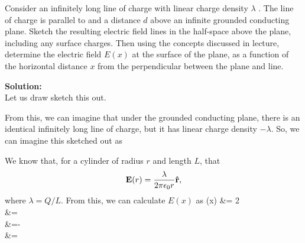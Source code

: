\documentclass[11pt]{article}
\def\bal#1\eal{\begin{align*}#1\end{align*}}
\newcommand{\pn}[1]{\left( #1 \right)}
\begin{document}
\clearpage

\begin{problem}[4.]
Consider an infinitely long line of charge with linear charge density $\lambda$ . The line of charge
is parallel to and a distance $d$ above an infinite grounded conducting plane. Sketch the
resulting electric field lines in the half-space above the plane, including any surface
charges. Then using the concepts discussed in lecture, determine the electric field $E(x)$ at
the surface of the plane, as a function of the horizontal distance $x$ from the perpendicular
between the plane and line.
\end{problem}


\textbf{Solution:}\\
Let us draw sketch this out.

\vfill

From this, we can imagine that under the grounded conducting plane, there is an identical infinitely long line of charge, but it has linear charge density $-\lambda$. So, we can imagine this sketched out as

\vfill

We know that, for a cylinder of radius $r$ and length $L$, that
\[
	\mathbf{E}(r) = \frac{\lambda}{2\pi\epsilon_0r}\mathbf{\hat{r}},
\]
where $\lambda=Q/L$. From this, we can calculate $E(x)$ as
\bal
	E(x) &= 2\,\\
	&=\cos\theta\, \\
	&=-\, \\
	&=\boxed{-\frac{\lambda d}{\pi\epsilon_0\pn{x^2+d^2}} \,\VEC{\hat{y}}.}
\eal


\clearpage
\end{document}
